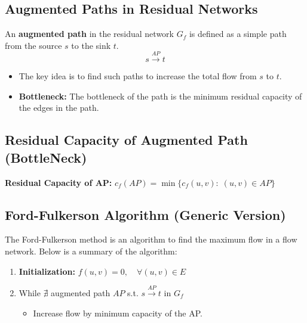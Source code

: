 \subsection{Augmented Paths in Residual Networks}
\begin{definition}
    An \textbf{augmented path} in the residual network $G_f$ is defined as a simple path from the source $s$ to the sink $t$. 
    \begin{equation*}
        s \overset{AP}{\rightarrow} t
    \end{equation*}
    \begin{itemize}
        \item The key idea is to find such paths to increase the total flow from $s$ to $t$.
        \item \textbf{Bottleneck:} The bottleneck of the path is the minimum residual capacity of the edges in the path. 
    \end{itemize}
\end{definition}

\subsection{Residual Capacity of Augmented Path (BottleNeck)}
\begin{definition}
    \textbf{Residual Capacity of AP:} $c_f (AP) = \min \{c_f(u,v): \; (u,v) \in AP\}$
\end{definition}

\subsection{Ford-Fulkerson Algorithm (Generic Version)}
\begin{algo}
    The Ford-Fulkerson method is an algorithm to find the maximum flow in a flow network. Below is a summary of the algorithm:

    \begin{enumerate}
        \item \textbf{Initialization:} $f(u, v) = 0, \quad \forall (u, v) \in E$
        \item While $\nexists$ augmented path $AP$ s.t. $s \overset{AP}{\rightarrow} t$ in $G_f$
        \begin{itemize}
            \item Increase flow by minimum capacity of the AP.
        \end{itemize}
    \end{enumerate}
\end{algo}


